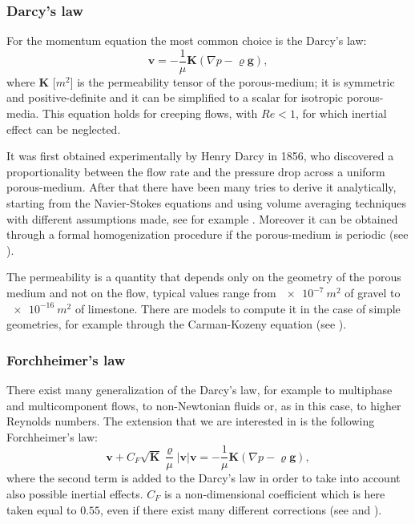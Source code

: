 \subsubsection{Darcy's law}
For the momentum equation the most common choice is the Darcy's law:
\begin{equation} \label{eq:darcy}
	\mathbf{v} = -\frac{1}{\mu}\mathbf{K} (\nabla p - \varrho \mathbf{g}),
\end{equation}
where $\mathbf{K}$ [$\si{m^2}$] is the permeability tensor of the 
porous-medium; it is symmetric and positive-definite and it can be simplified 
to a scalar for isotropic porous-media. 
This equation holds for creeping flows, with $Re < 1$, for which 
inertial effect can be neglected.

It was first obtained experimentally by Henry Darcy in 1856, who discovered a 
proportionality between the flow rate and the pressure drop across a uniform 
porous-medium. After that there have been many tries to derive it analytically, 
starting from the Navier-Stokes equations and using volume averaging techniques 
with different assumptions made, see for example \cite{volaver:ithakerdarcy}. 
Moreover it can be obtained through a formal homogenization procedure if the 
porous-medium is periodic (see \cite{homo:holmes}).

The permeability is a quantity that depends only on the geometry of the porous 
medium and not on the flow, typical values range from $\SI{e-7}{m^2}$ of 
gravel to $\SI{e-16}{m^2}$ of limestone.
There are models to compute it in the case of simple geometries, for example 
through the Carman-Kozeny equation (see \cite{forch:nield}). 
%
\subsubsection{Forchheimer's law}
There exist many generalization of the Darcy's law, for example to multiphase 
and multicomponent flows, to non-Newtonian fluids or, as in this case, to 
higher Reynolds numbers. The 
extension that we are interested in is the following Forchheimer's law:
\begin{equation} \label{eq:forch}
	\mathbf{v} + C_F \sqrt{\mathbf{K}} \frac{\varrho}{\mu} 
	|\mathbf{v}|\mathbf{v} = - \frac{1}{\mu} \mathbf{K}(\nabla p - \varrho 
	\mathbf{g} ),
\end{equation}
where the second term is added to the Darcy's law in order to take into account 
also possible inertial effects. $C_F$ is a non-dimensional coefficient which is 
here taken equal to $0.55$, even if there exist many different corrections (see 
\cite{forch:nield} and \cite{forch:tesi}).

